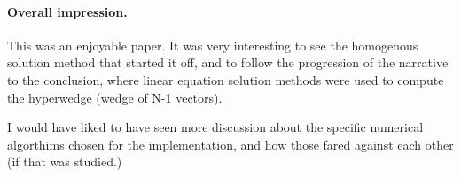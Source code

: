 %
%
%
%
%
%
%
%
%
%
%
%
%
%
%
%
%
%
%
%
%
%
%
%
%
%
%
%





\paragraph{Overall impression.}
This was an enjoyable paper.  It was very interesting to see the homogenous solution method that started it off, and to follow the progression of the narrative to the conclusion, where linear equation solution methods were used to compute the hyperwedge (wedge of N-1 vec{t}ors).

I would have liked to have seen more discussion about the specific numerical algorthims chosen for the implementation, and how those fared against each other (if that was studied.)


